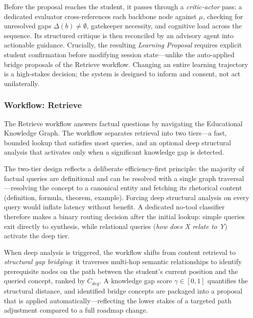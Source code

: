 Before the proposal reaches the student, it passes through a \textit{critic-actor} pass: a dedicated evaluator cross-references each backbone node against $\mu$, checking for unresolved gaps $\Delta(b) \neq \emptyset$, gatekeeper necessity, and cognitive load across the sequence. Its structured critique is then reconciled by an advisory agent into actionable guidance. Crucially, the resulting \textit{Learning Proposal} requires explicit student confirmation before modifying session state---unlike the auto-applied bridge proposals of the Retrieve workflow. Changing an entire learning trajectory is a high-stakes decision; the system is designed to inform and consent, not act unilaterally.

\subsubsection{Workflow: Retrieve}\label{subsub:wf_retrieve}

The Retrieve workflow answers factual questions by navigating the Educational Knowledge Graph. The workflow separates retrieval into two tiers---a fast, bounded lookup that satisfies most queries, and an optional deep structural analysis that activates only when a significant knowledge gap is detected.



The two-tier design reflects a deliberate efficiency-first principle: the majority of factual queries are definitional and can be resolved with a single graph traversal---resolving the concept to a canonical entity and fetching its rhetorical content (definition, formula, theorem, example). Forcing deep structural analysis on every query would inflate latency without benefit. A dedicated no-tool classifier therefore makes a binary routing decision after the initial lookup: simple queries exit directly to synthesis, while relational queries (\textit{how does X relate to Y}) activate the deep tier.

When deep analysis is triggered, the workflow shifts from content retrieval to \textit{structural gap bridging}: it traverses multi-hop semantic relationships to identify prerequisite nodes on the path between the student's current position and the queried concept, ranked by $C_{deg}$. A knowledge gap score $\gamma \in [0,1]$ quantifies the structural distance, and identified bridge concepts are packaged into a proposal that is applied automatically---reflecting the lower stakes of a targeted path adjustment compared to a full roadmap change.

